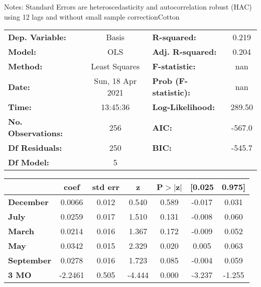 Notes: \newline
 [1] Standard Errors are heteroscedasticity and autocorrelation robust (HAC) using 12 lags and without small sample correctionCotton\begin{center}
\begin{tabular}{lclc}
\toprule
\textbf{Dep. Variable:}    &      Basis       & \textbf{  R-squared:         } &     0.219   \\
\textbf{Model:}            &       OLS        & \textbf{  Adj. R-squared:    } &     0.204   \\
\textbf{Method:}           &  Least Squares   & \textbf{  F-statistic:       } &       nan   \\
\textbf{Date:}             & Sun, 18 Apr 2021 & \textbf{  Prob (F-statistic):} &      nan    \\
\textbf{Time:}             &     13:45:36     & \textbf{  Log-Likelihood:    } &    289.50   \\
\textbf{No. Observations:} &         256      & \textbf{  AIC:               } &    -567.0   \\
\textbf{Df Residuals:}     &         250      & \textbf{  BIC:               } &    -545.7   \\
\textbf{Df Model:}         &           5      & \textbf{                     } &             \\
\bottomrule
\end{tabular}
\begin{tabular}{lcccccc}
                   & \textbf{coef} & \textbf{std err} & \textbf{z} & \textbf{P$> |$z$|$} & \textbf{[0.025} & \textbf{0.975]}  \\
\midrule
\textbf{December}  &       0.0066  &        0.012     &     0.540  &         0.589        &       -0.017    &        0.031     \\
\textbf{July}      &       0.0259  &        0.017     &     1.510  &         0.131        &       -0.008    &        0.060     \\
\textbf{March}     &       0.0214  &        0.016     &     1.367  &         0.172        &       -0.009    &        0.052     \\
\textbf{May}       &       0.0342  &        0.015     &     2.329  &         0.020        &        0.005    &        0.063     \\
\textbf{September} &       0.0278  &        0.016     &     1.723  &         0.085        &       -0.004    &        0.059     \\
\textbf{3 MO}      &      -2.2461  &        0.505     &    -4.444  &         0.000        &       -3.237    &       -1.255     \\

\end{tabular}
\end{center}
